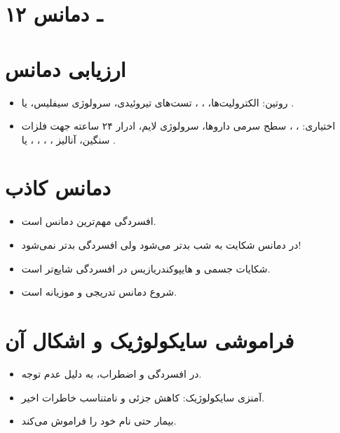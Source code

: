 \section*{۱۲ ـ دمانس}
\section{ارزیابی دمانس}
\begin{itemize}
\item روتین: الکترولیت‌ها، ، ، تست‌های تیروئیدی، سرولوژی سیفلیس،  یا .
\item اختیاری: ، ، سطح سرمی داروها، سرولوژی لایم، ادرار ۲۴ ساعته جهت فلزات سنگین، آنالیز ، ، ، ،  یا .
\end{itemize}
\section{دمانس کاذب}
\begin{itemize}
\item افسردگی مهم‌ترین  دمانس است.
\item در دمانس شکایت به شب بدتر می‌شود ولی افسردگی بدتر نمی‌شود!
\item شکایات جسمی و هایپوکندریازیس در افسردگی شایع‌تر است.
\item شروع دمانس تدریجی و موزیانه است.
\end{itemize}
\section{فراموشی سایکولوژیک و اشکال آن}
\begin{itemize}
\item در افسردگی و اضطراب، به دلیل عدم توجه.
\item آمنزی سایکولوژیک: کاهش جزئی و نامتناسب خاطرات اخیر.
\item بیمار حتی نام خود را فراموش می‌کند.
\end{itemize}
